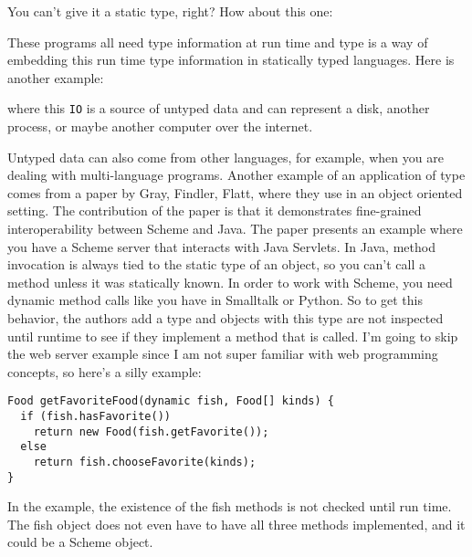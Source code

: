 \documentclass[12pt]{article}	%
\begin{document}
$\;$\\
$\;$\\

\noindent You can't give it a static type, right? How about this one:

$\;$\\
$\;$\\

\noindent These programs all need type information at run time and type \Dynamic is a way of embedding this run time type information in statically typed languages. Here is another example:

$\;$\\
$\;$\\

\noindent where this \texttt{IO} is a source of untyped data and can represent a disk, another process, or maybe another computer over the internet.

Untyped data can also come from other languages, for example, when you are dealing with multi-language programs. Another example of an application of type \Dynamic comes from a paper by Gray, Findler, Flatt, where they use \Dynamic in an object oriented setting. The contribution of the paper is that it demonstrates fine-grained interoperability between Scheme and Java. The paper presents an example where you have a Scheme server that interacts with Java Servlets. In Java, method invocation is always tied to the static type of an object, so you can't call a method unless it was statically known. In order to work with Scheme, you need dynamic method calls like you have in Smalltalk or Python. So to get this behavior, the authors add a \dynamic type and objects with this type are not inspected until runtime to see if they implement a method that is called. I'm going to skip the web server example since I am not super familiar with web programming concepts, so here's a silly example:

\begin{verbatim}
Food getFavoriteFood(dynamic fish, Food[] kinds) {
  if (fish.hasFavorite())
    return new Food(fish.getFavorite());
  else
    return fish.chooseFavorite(kinds);
}
\end{verbatim}

In the example, the existence of the fish methods is not checked until run time. The fish object does not even have to have all three methods implemented, and it could be a Scheme object.
\end{document}
